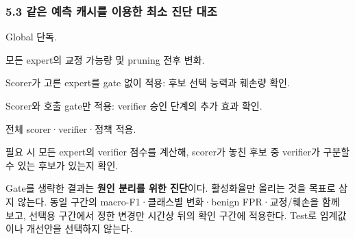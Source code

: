 \subsubsection{5.3 같은 예측 캐시를 이용한 최소 진단 대조}
\par\noindent \textbullet\enspace Global 단독.


\par\noindent \textbullet\enspace 모든 expert의 교정 가능량 및 pruning 전후 변화.


\par\noindent \textbullet\enspace Scorer가 고른 expert를 gate 없이 적용: 후보 선택 능력과 훼손량 확인.


\par\noindent \textbullet\enspace Scorer와 호출 gate만 적용: verifier 승인 단계의 추가 효과 확인.


\par\noindent \textbullet\enspace 전체 scorer·verifier·정책 적용.


\par\noindent \textbullet\enspace 필요 시 모든 expert의 verifier 점수를 계산해, scorer가 놓친 후보 중 verifier가 구분할 수 있는 후보가 있는지 확인.


Gate를 생략한 결과는 \textbf{원인 분리를 위한 진단}이다. 활성화율만 올리는 것을 목표로 삼지 않는다. 동일 구간의 macro-F1·클래스별 변화·benign FPR·교정/\allowbreak{}훼손을 함께 보고, 선택용 구간에서 정한 변경만 시간상 뒤의 확인 구간에 적용한다. Test로 임계값이나 개선안을 선택하지 않는다.


